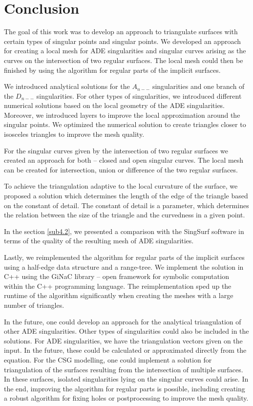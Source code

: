 \chapter*{Conclusion}  %
The goal of this work was to develop an approach to triangulate
surfaces with certain types of singular points and singular points.
We developed an approach for creating a local mesh for ADE singularities
and singular curves arising as the curves on the intersection of two regular
surfaces.
The local mesh could then be finished by using the 
algorithm for regular parts of the implicit surfaces.

We introduced analytical solutions for the $A_{n--}$ singularities and
one branch of the $D_{n--}$ singularities. For other types of singularities, we 
introduced different numerical solutions based on the local geometry of 
the ADE singularities. Moreover, we introduced layers to improve the local 
approximation around the singular points. We optimized the numerical solution
to create triangles closer to isosceles triangles to improve the 
mesh quality.

For the singular curves given by the intersection of two regular surfaces
we created an approach for both -- closed and open singular curves.
The local mesh can be created for intersection, union or difference of the
two regular surfaces.

To achieve the triangulation adaptive to the local curvature of the surface,
we proposed a solution which determines the length of the edge of the triangle
based on the constant of detail. The constant of detail is a parameter,
which determines the relation between the size of the triangle and the curvedness
in a given point.

In the section \ref{sub4.2}, we presented a comparison with the SingSurf software 
\cite{morris2003client} in terms of the quality of the resulting mesh of ADE singularities.

Lastly, we reimplemented the algorithm for regular parts of the implicit surfaces
using a half-edge data structure and a range-tree. We implement the solution in C++
using the GiNaC library \cite{bauer2002introduction} -- open framework for symbolic 
computation within the C++ programming language.
The reimplementation sped up the runtime of the algorithm significantly when creating the meshes with a large number
of triangles.

In the future, one could develop an approach for the analytical triangulation of 
other ADE singularities. Other types of singularities could also be included in 
the solutions. For ADE singularities, we have the triangulation vectors given on 
the input. In the future, these could be calculated or approximated directly from 
the equation. For the CSG modelling, one could implement a solution for triangulation of the surfaces resulting from the intersection of multiple surfaces. In these surfaces, isolated singularities lying on the singular curves could arise. In the end,
improving the algorithm for regular parts is possible, including
creating a robust algorithm for fixing holes or postprocessing to improve the
mesh quality.

